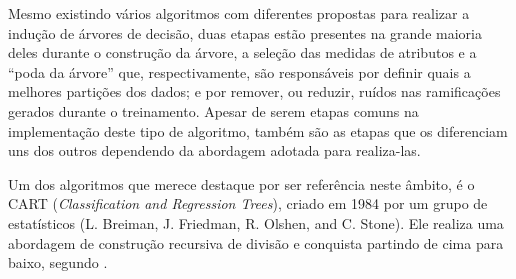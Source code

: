 \documentclass[oneside,openright,12pt]{ufsm_2015} %
\begin{document}
    \par Mesmo existindo vários algoritmos com diferentes propostas para realizar a indução de árvores de decisão, duas etapas estão presentes na grande maioria deles durante o construção da árvore, a seleção das medidas de atributos e a ``poda da árvore'' que, respectivamente, são responsáveis por definir quais a melhores partições dos dados; e por remover, ou reduzir, ruídos nas ramificações gerados durante o treinamento. Apesar de serem etapas comuns na implementação deste tipo de algoritmo, também são as etapas que os diferenciam uns dos outros dependendo da abordagem adotada para realiza-las.
    
    \par Um dos algoritmos que merece destaque por ser referência neste âmbito, é o CART (\textit{Classification and Regression Trees}), criado em 1984 por um grupo de estatísticos (L. Breiman, J. Friedman, R. Olshen, and C. Stone). Ele realiza uma abordagem de construção recursiva de divisão e conquista partindo de cima para baixo, segundo \cite{book:han:11}.


\end{document}
